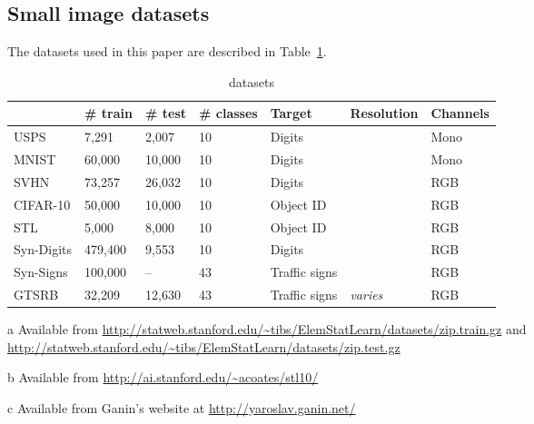 \documentclass{article}
\begin{document}
\subsection{Small image datasets}

The datasets used in this paper are described in Table~\ref{tab:datasets}.

\begin{table}[h!t]
\begin{center}
\footnotesize
\begin{threeparttable}
\begin{tabular}{lllllll}
\hline
{} &              \# train &     \# test &      \# classes &   Target &     Resolution &      Channels \\
\hline

USPS\tnote{a} &   7,291 &        2,007 &        10 &           Digits &      &    Mono     \\    
MNIST &           60,000 &       10,000 &       10 &           Digits &      &    Mono     \\
SVHN &            73,257 &       26,032 &       10 &           Digits &      &    RGB     \\
CIFAR-10 &        50,000 &       10,000 &       10 &           Object ID &     &    RGB     \\
STL\tnote{b} &    5,000 &        8,000 &        10 &           Object ID &     &    RGB     \\
Syn-Digits\tnote{c} &  479,400 & 9,553 &        10 &           Digits &      &    RGB     \\
Syn-Signs &       100,000 &      -- &           43 &           Traffic signs &   &    RGB     \\
GTSRB &           32,209 &       12,630 &       43 &           Traffic signs &  \emph{varies} &   RGB     \\

\hline
\end{tabular}

\begin{tablenotes}
   \item[a] Available from \url{http://statweb.stanford.edu/~tibs/ElemStatLearn/datasets/zip.train.gz} and
   \url{http://statweb.stanford.edu/~tibs/ElemStatLearn/datasets/zip.test.gz}
   \item[b] Available from \url{http://ai.stanford.edu/~acoates/stl10/}
   \item[c] Available from Ganin's website at \url{http://yaroslav.ganin.net/}
\end{tablenotes}

\caption{datasets}
\label{tab:datasets}

\end{threeparttable}
\end{center}
\end{table}
\end{document}
